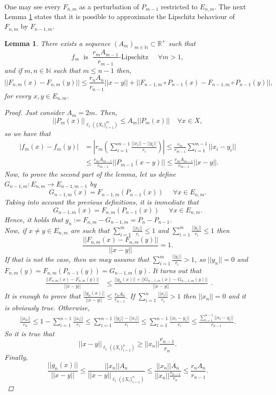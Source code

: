 \documentclass[11pt]{amsart}
\newcommand{\N}{\mathbb{N}}
\newcommand{\R}{\mathbb{R}}
\newcommand{\<}{\langle}
\renewcommand{\>}{\rangle}
\newtheorem{lemma}[theorem]{Lemma}
\theoremstyle{definition}
\theoremstyle{remark}
\numberwithin{equation}{section}
\def\R{{\mathbb R}}
\begin{document}
One may see every $F_{n,m}$ as a perturbation of $P_{m-1}$ restricted to $E_{n,m}$. The next Lemma \ref{lemmalip2} states that it is possible to approximate the Lipschitz behaviour of $F_{n,m}$ by $F_{n-1,m}$.

\begin{lemma}\label{lemmalip2}
There exists a sequence $(A_m)_{m\in\N}\subset \R^+$ such that 
$$f_m\;\text{ is }\;\frac{r_mA_{m-1}}{r_{m-1}}\text{-Lipschitz}\;\;\;\;\;\forall m>1,$$
and if $m,n\in\N$ such that $m\le n-1$ then,
$$||F_{n,m}(x)-F_{n,m}(y)||\le\frac{r_nA_n}{r_{n-1}}||x-y||+||F_{n-1,m}\circ P_{n-1}(x)-F_{n-1,m}\circ P_{n-1}(y)||,$$
for every $x,y\in E_{n,m}$.
\begin{proof}
Just consider $A_m=2m$. Then, 
$$||P_m(x)||_{\ell_1(\{X_i\}_{i=1}^m)}\le A_m ||P_m(x)||\;\;\;\;\forall x\in X,$$
so we have that
$$\begin{aligned}|f_m(x)-f_m(y)|&=\left|r_m\left(\sum\limits_{i=1}^{m-1}\frac{||x_i||-||y_i||}{r_i}\right)\right|\le \frac{r_m}{r_{m-1}}\sum\limits_{i=1}^{m-1}||x_i-y_i||\\
&\le \frac{r_mA_{m-1}}{r_{m-1}}||P_{m-1}(x-y)||\le  \frac{r_mA_{m-1}}{r_{m-1}}||x-y||.\end{aligned}$$
Now, to prove the second part of the lemma, let us define $G_{n-1,m}:E_{n,m}\rightarrow E_{n-1,m-1}$ by
$$G_{n-1,m}(x)=F_{n-1,m}(P_{n-1}(x))\;\;\;\;\;\forall x\in E_{n,m}.$$
Taking into account the previous definitions, it is immediate that
$$G_{n-1,m}(x)=F_{n,m}(P_{n-1}(x))\;\;\;\;\;\forall x\in E_{n,m}.$$
Hence, it holds that $g_n:=F_{n,m}-G_{n-1,m}=P_{n}-P_{n-1}$.\\
Now, if $x\neq y\in E_{n,m}$ are such that $\sum\limits_{i=1}^{m}\frac{||x_i||}{r_i}\le1$ and $\sum\limits_{i=1}^{m}\frac{||y_i||}{r_i}\le 1$ then
$$\frac{||F_{n,m}(x)-F_{n,m}(y)||}{||x-y||}=1.$$
If that is not the case, then we may assume that $\sum\limits_{i=1}^{m}\frac{||y_i||}{r_i}>1$, so $||y_n||=0$ and $F_{n,m}(y)=F_{n,m}(P_{n-1}(y))=G_{n-1,m}(y)$. It turns out that
$$\begin{aligned}\frac{||F_{n,m}(x)-F_{n,m}(y)||}{||x-y||}&\le \frac{||g_n(x)||+||G_{n-1,m}(x)-G_{n-1,m}(y)||}{||x-y||}\end{aligned}.$$
It is enough to prove that $\frac{||g_n(x)||}{||x-y||}\le\frac{r_nA_n}{r_{n-1}}$. If $\sum\limits_{i=1}^{n}\frac{||x_i||}{r_i}>1$ then $||x_n||=0$ and it is obviously true. Otherwise,
$$\begin{aligned} \frac{||x_n||}{r_n}\le1- \sum\limits_{i=1}^{n-1}\frac{||x_i||}{r_i}\le \sum\limits_{i=1}^{n-1}\frac{||y_i||-||x_i||}{r_i}\le \sum\limits_{i=1}^{n-1}\frac{||x_i-y_i||}{r_i}\le\frac{\sum\limits_{i=1}^{n-1}||x_i-y_i||}{r_{n-1}} .\end{aligned}$$
So it is true that
$$||x-y||_{\ell_1(\{X_i\}_{i=1}^n)}\ge ||x_n||\frac{r_{n-1}}{r_n}.$$
Finally,
$$\frac{||g_n(x)||}{||x-y||}\le \frac{||x_n||A_n}{||x-y||_{\ell_1(\{X_i\}_{i=1}^n)}}\le\frac{||x_n||A_n}{||x_n||\frac{r_{n-1}}{r_n}}\le \frac{r_nA_n}{r_{n-1}}.$$
\end{proof}
\end{lemma}
\end{document}
